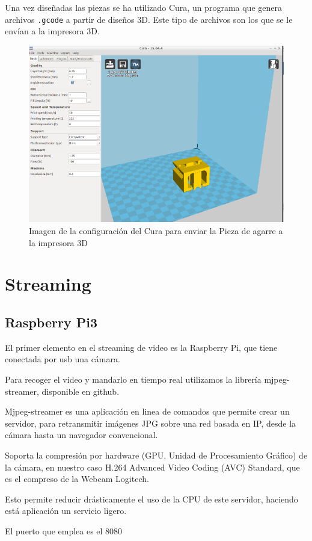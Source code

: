 \documentclass[twoside, 12pt]{epstfg}
\begin{document}
Una vez diseñadas las piezas se ha utilizado Cura, un programa que genera archivos \texttt{.gcode} a partir de diseños 3D. Este tipo de archivos son los que se le envían a la impresora 3D.

\begin{figure}[h]
	\centerline{
		\mbox{\includegraphics[width=.75\textwidth]{images/Cura2.png}}
	}
	\caption{Imagen de la configuración del Cura para enviar la Pieza de agarre a la impresora 3D}
\end{figure}
 
\newpage
\section{Streaming}
\subsection{Raspberry Pi3}
El primer elemento en el streaming de video es la Raspberry Pi, que tiene conectada por usb una cámara.

Para recoger el video y mandarlo en tiempo real utilizamos la librería mjpeg-streamer, disponible en github.

Mjpeg-streamer es una aplicación en linea de comandos que permite crear un servidor, para retransmitir imágenes JPG sobre una red basada en IP, desde la cámara hasta un navegador convencional.

Soporta la compresión por hardware (GPU, Unidad de Procesamiento Gráfico) de la cámara, en nuestro caso H.264 Advanced Video Coding (AVC) Standard, que es el compreso de la Webcam Logitech.

Esto permite reducir drásticamente el uso de la CPU de este servidor, haciendo está aplicación un servicio ligero.

El puerto que emplea es el 8080
\end{document}
